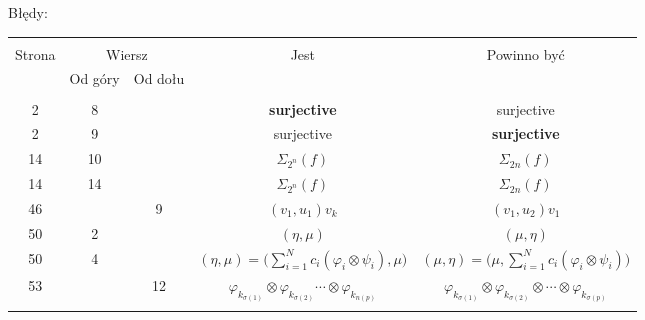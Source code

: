 \documentclass[a4paper,11pt]{article}
\newcommand{\tb}{\textbf}
\begin{document}
Błędy:\\
\begin{center}
  \begin{tabular}{|c|c|c|c|c|}
    \hline
    & \multicolumn{2}{c|}{} & & \\
    Strona & \multicolumn{2}{c|}{Wiersz}& Jest & Powinno być \\ \cline{2-3}
    & Od góry & Od dołu &  &  \\ \hline
    & & & & \\
    2 & 8 & & \tb{surjective} & surjective \\
    2 & 9 & & surjective & \tb{surjective} \\
    14 & 10 & & $\Sigma_{ 2^{ n } }( f )$ & $\Sigma_{ 2 n }( f )$ \\
    14 & 14 & & $\Sigma_{ 2^{ n } }( f )$ & $\Sigma_{ 2 n }( f )$ \\
    46 & & 9 & $(v_{ 1 }, u_{ 1 } ) v_{ k }$ & $(v_{ 1 }, u_{ 2 } ) v_{ 1 }$ \\
    50 & 2 & & $( \eta, \mu )$ & $( \mu, \eta )$ \\
    50 & 4 & & $( \eta, \mu ) = \bigg( \sum\limits_{ i = 1 }^{ N } c_{ i } ( \varphi_{ i } \otimes \psi_{ i } ), \mu \bigg)$ & $( \mu, \eta ) = \bigg( \mu, \sum\limits_{ i = 1 }^{ N } c_{ i } ( \varphi_{ i } \otimes \psi_{ i } )\bigg)$ \\
    53 & & 12 & $\varphi_{ k_{ \sigma( 1 ) } } \otimes \varphi_{ k_{ \sigma( 2 ) } } \cdots \otimes \varphi_{ k_{ n( p ) } }$ & $\varphi_{ k_{ \sigma( 1 ) } } \otimes \varphi_{ k_{ \sigma( 2 ) }  } \otimes \cdots \otimes \varphi_{ k_{ \sigma( p ) } }$ \\
    & & & & \\ \hline
  \end{tabular}
\end{center}









 {}
\end{document}
